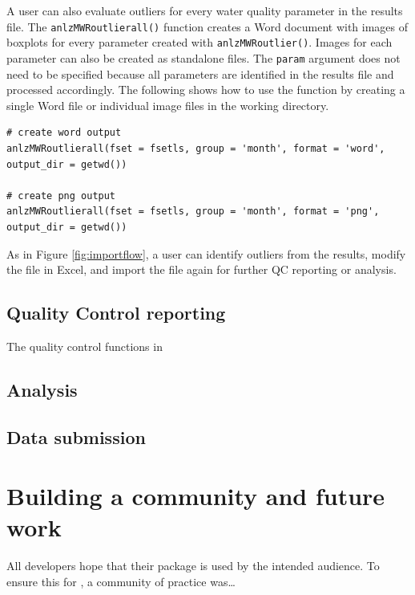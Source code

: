 A user can also evaluate outliers for every water quality parameter in the results file. The \texttt{anlzMWRoutlierall()} function creates a Word document with images of boxplots for every parameter created with \texttt{anlzMWRoutlier()}. Images for each parameter can also be created as standalone files. The \texttt{param} argument does not need to be specified because all parameters are identified in the results file and processed accordingly. The following shows how to use the function by creating a single Word file or individual image files in the working directory.

\begin{verbatim}
# create word output
anlzMWRoutlierall(fset = fsetls, group = 'month', format = 'word', output_dir = getwd())

# create png output
anlzMWRoutlierall(fset = fsetls, group = 'month', format = 'png', output_dir = getwd())
\end{verbatim}

As in Figure \ref{fig:importflow}, a user can identify outliers from the results, modify the file in Excel, and import the file again for further QC reporting or analysis.

\hypertarget{quality-control-reporting}{%
\subsection{Quality Control reporting}\label{quality-control-reporting}}

The quality control functions in 

\hypertarget{analysis}{%
\subsection{Analysis}\label{analysis}}

\hypertarget{data-submission}{%
\subsection{Data submission}\label{data-submission}}

\hypertarget{building-a-community-and-future-work}{%
\section{Building a community and future work}\label{building-a-community-and-future-work}}

All developers hope that their package is used by the intended audience. To ensure this for , a community of practice was\ldots{}

